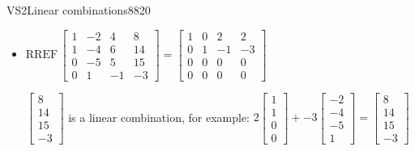 \begin{exercise}{VS2}{Linear combinations}{8820}
\begin{exerciseAnswer}
\begin{itemize}
 

 \(\left[\begin{array}{c}
9 \\
13 \\
16 \\
-2
\end{array}\right]\) is not a linear combination. 

 
\item  

 \(
\mathrm{RREF}\, \left[\begin{array}{ccc|c}
1 & -2 & 4 & 8 \\
1 & -4 & 6 & 14 \\
0 & -5 & 5 & 15 \\
0 & 1 & -1 & -3
\end{array}\right] = \left[\begin{array}{ccc|c}
1 & 0 & 2 & 2 \\
0 & 1 & -1 & -3 \\
0 & 0 & 0 & 0 \\
0 & 0 & 0 & 0
\end{array}\right]
                        \) 

 

 \(\left[\begin{array}{c}
8 \\
14 \\
15 \\
-3
\end{array}\right]\) is a linear combination, for example: \(
2 \left[\begin{array}{c}
1 \\
1 \\
0 \\
0
\end{array}\right] + -3 \left[\begin{array}{c}
-2 \\
-4 \\
-5 \\
1
\end{array}\right] = \left[\begin{array}{c}
8 \\
14 \\
15 \\
-3
\end{array}\right]
                            \) 

 
\end{itemize}

     \end{exerciseAnswer}
 \end{exercise}


